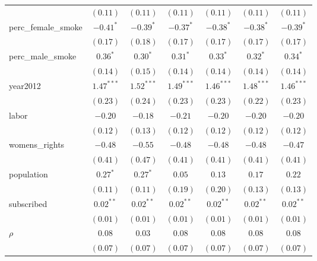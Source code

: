 \begin{table}[!h]
\begin{center}
\begin{tabular}{l c c c c c c }
                        & $(0.11)$     & $(0.11)$     & $(0.11)$     & $(0.11)$     & $(0.11)$     & $(0.11)$     \\
perc\_female\_smoke     & $-0.41^{*}$  & $-0.39^{*}$  & $-0.37^{*}$  & $-0.38^{*}$  & $-0.38^{*}$  & $-0.39^{*}$  \\
                        & $(0.17)$     & $(0.18)$     & $(0.17)$     & $(0.17)$     & $(0.17)$     & $(0.17)$     \\
perc\_male\_smoke       & $0.36^{*}$   & $0.30^{*}$   & $0.31^{*}$   & $0.33^{*}$   & $0.32^{*}$   & $0.34^{*}$   \\
                        & $(0.14)$     & $(0.15)$     & $(0.14)$     & $(0.14)$     & $(0.14)$     & $(0.14)$     \\
year2012                & $1.47^{***}$ & $1.52^{***}$ & $1.49^{***}$ & $1.46^{***}$ & $1.48^{***}$ & $1.46^{***}$ \\
                        & $(0.23)$     & $(0.24)$     & $(0.23)$     & $(0.23)$     & $(0.22)$     & $(0.23)$     \\
labor                   & $-0.20$      & $-0.18$      & $-0.21$      & $-0.20$      & $-0.20$      & $-0.20$      \\
                        & $(0.12)$     & $(0.13)$     & $(0.12)$     & $(0.12)$     & $(0.12)$     & $(0.12)$     \\
womens\_rights          & $-0.48$      & $-0.55$      & $-0.48$      & $-0.48$      & $-0.48$      & $-0.47$      \\
                        & $(0.41)$     & $(0.47)$     & $(0.41)$     & $(0.41)$     & $(0.41)$     & $(0.41)$     \\
population              & $0.27^{*}$   & $0.27^{*}$   & $0.05$       & $0.13$       & $0.17$       & $0.22$       \\
                        & $(0.11)$     & $(0.11)$     & $(0.19)$     & $(0.20)$     & $(0.13)$     & $(0.13)$     \\
subscribed              & $0.02^{**}$  & $0.02^{**}$  & $0.02^{**}$  & $0.02^{**}$  & $0.02^{**}$  & $0.02^{**}$  \\
                        & $(0.01)$     & $(0.01)$     & $(0.01)$     & $(0.01)$     & $(0.01)$     & $(0.01)$     \\
$\rho$                  & $0.08$       & $0.03$       & $0.08$       & $0.08$       & $0.08$       & $0.08$       \\
                        & $(0.07)$     & $(0.07)$     & $(0.07)$     & $(0.07)$     & $(0.07)$     & $(0.07)$     \\

\end{tabular}
\end{center}
\end{table}
